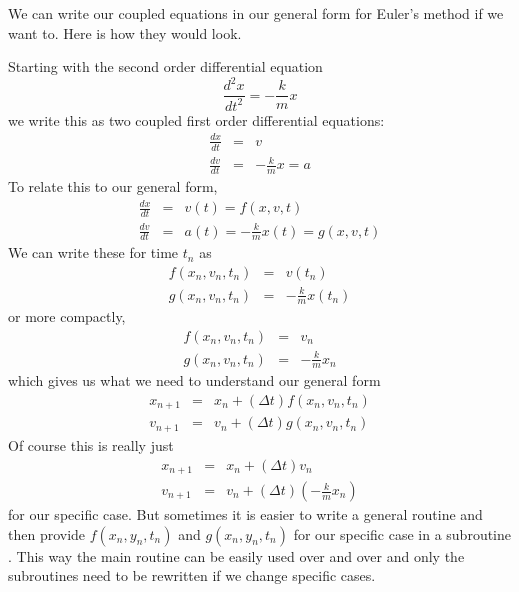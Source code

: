 \documentclass[twoside,11pt,ShortChapTitles]{BYUTextbook}
\begin{document}
We can write our coupled equations in our general form for Euler's method if
we want to. Here is how they would look.

Starting with the second order differential equation 
\[
\frac{d^{2}x}{dt^{2}}=-\frac{k}{m}x 
\]%
we write this as two coupled first order differential equations: 
\begin{eqnarray*}
\frac{dx}{dt} &=&v \\
\frac{dv}{dt} &=&-\frac{k}{m}x=a
\end{eqnarray*}%
To relate this to our general form, 
\begin{eqnarray*}
\frac{dx}{dt} &=&v(t)=f(x,v,t) \\
\frac{dv}{dt} &=&a(t)=-\frac{k}{m}x\left( t\right) =g(x,v,t)
\end{eqnarray*}%
We can write these for time $t_{n}$ as%
\begin{eqnarray*}
f(x_{n},v_{n},t_{n}) &=&v(t_{n}) \\
g(x_{n},v_{n},t_{n}) &=&-\frac{k}{m}x\left( t_{n}\right)
\end{eqnarray*}%
or more compactly,%
\begin{eqnarray*}
f(x_{n},v_{n},t_{n}) &=&v_{n} \\
g(x_{n},v_{n},t_{n}) &=&-\frac{k}{m}x_{n}
\end{eqnarray*}%
which gives us what we need to understand our general form%
\begin{eqnarray*}
x_{n+1} &=&x_{n}+(\Delta t)f(x_{n},v_{n},t_{n}) \\
v_{n+1} &=&v_{n}+(\Delta t)g(x_{n},v_{n},t_{n})
\end{eqnarray*}%
Of course this is really just 
\begin{eqnarray*}
x_{n+1} &=&x_{n}+(\Delta t)v_{n} \\
v_{n+1} &=&v_{n}+(\Delta t)\left( -\frac{k}{m}x_{n}\right)
\end{eqnarray*}%
for our specific case. But sometimes it is easier to write a general routine
and then provide $f(x_{n},y_{n},t_{n})$ and $g(x_{n},y_{n},t_{n})$ for our
specific case in a subroutine%
. This way the main routine can be easily used over and over and only the
subroutines need to be rewritten if we change specific cases.
\end{document}
